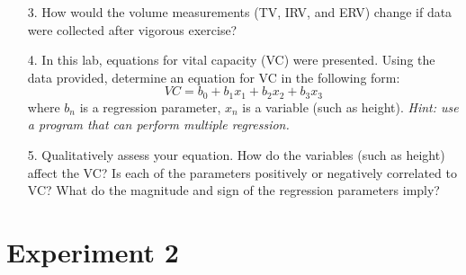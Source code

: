 \documentclass{article}
\begin{document}
\begin{itemize}
	\item[3.] How would the volume measurements (TV, IRV, and ERV) change if data were collected after vigorous exercise?\pagebreak
	\item[4.] In this lab, equations for vital capacity (VC) were presented. Using the data provided, determine an equation for VC in the following form:\begin{equation}
		VC = b_0 + b_1x_1 + b_2x_2 + b_3x_3
	\end{equation}
	where $b_n$ is a regression parameter, $x_n$ is a variable (such as height). \textit{Hint: use a program that can perform multiple regression.}\vspace{3cm}
	\item[5.] Qualitatively assess your equation. How do the variables (such as height) affect the VC? Is each of the parameters positively or negatively correlated to VC? What do the magnitude and sign of the regression parameters imply?\vspace{5cm}
\end{itemize}

\section*{Experiment 2}
\end{document}

